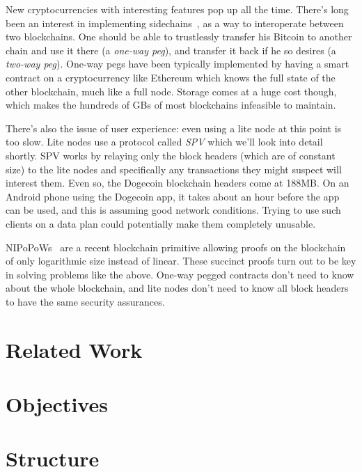 New cryptocurrencies with interesting features pop up all the time. There's long been an interest in implementing sidechains~\cite{sidechains}, as a way to interoperate between two blockchains. One should be able to trustlessly transfer his Bitcoin to another chain and use it there (a \emph{one-way peg}), and transfer it back if he so desires (a \emph{two-way peg}). One-way pegs have been typically implemented by having a smart contract on a cryptocurrency like Ethereum which knows the full state of the other blockchain, much like a full node. Storage comes at a huge cost though, which makes the hundreds of GBs of most blockchains infeasible to maintain.

There's also the issue of user experience: even using a lite node at this point is too slow. Lite nodes use a protocol called \emph{SPV} which we'll look into detail shortly. SPV works by relaying only the block headers (which are of constant size) to the lite nodes and specifically any transactions they might suspect will interest them. Even so, the Dogecoin blockchain headers come at 188MB. On an Android phone using the Dogecoin app, it takes about an hour before the app can be used, and this is assuming good network conditions. Trying to use such clients on a data plan could potentially make them completely unusable.

NIPoPoWs~\cite{nipopows} are a recent blockchain primitive allowing proofs on the blockchain of only logarithmic size instead of linear. These succinct proofs turn out to be key in solving problems like the above. One-way pegged contracts don't need to know about the whole blockchain, and lite nodes don't need to know all block headers to have the same security assurances.

\section{Related Work}
\section{Objectives}
\section{Structure}
